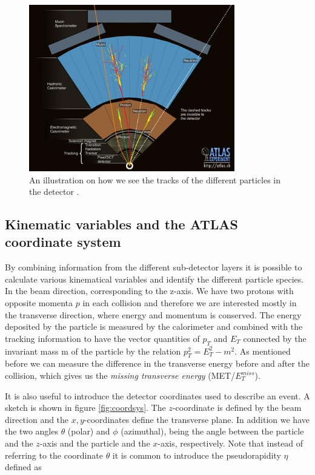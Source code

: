 \begin{figure}[H]
    \centering
    \includegraphics[width = 0.8\textwidth]{Figures/FromOnline/tracks.jpg}
    \caption{An illustration on how we see the tracks of the different particles in the detector \cite{tracks}.}
    \label{fig:tracks}
\end{figure}


\subsection{Kinematic variables and the ATLAS coordinate system}
By combining information from the different sub-detector layers it is possible to calculate various kinematical variables and identify the different particle species. In the beam direction, corresponding to the z-axis. We have two protons with opposite momenta $p$ in each collision and therefore we are interested mostly in the transverse direction, where energy and momentum is conserved. The energy deposited by the particle is measured by the calorimeter and combined with the tracking information to have the vector quantities of $p_T$ and $E_T$ connected by the invariant mass m of the particle by the relation $p_T^2 = E_T^2 - m^2$. As mentioned before we can measure the difference in the transverse energy before and after the collision, which gives us the \textit{missing transverse energy} (MET/$E_T^{miss}$). 

It is also useful to introduce the detector coordinates used to describe an event. A sketch is shown in figure \ref{fig:coordsys}. The $z$-coordinate is defined by the beam direction and the $x,y$-coordinates define the transverse plane. In addition we have the two angles $\theta$ (polar) and $\phi$ (azimuthal), being the angle between the particle and the $z$-axis and the particle and the $x$-axis, respectively. Note that instead of referring to the coordinate $\theta$ it is common to introduce the pseudorapidity $\eta$ defined as 

